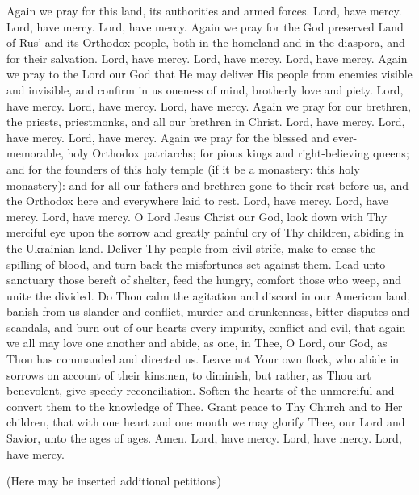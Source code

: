 \begin{liturgicaltext}
    \deacon Again we pray for this land, its authorities and armed forces.
    \choir Lord, have mercy. Lord, have mercy. Lord, have mercy.
    \deacon Again we pray for the God preserved Land of Rus' and its Orthodox people, both in the homeland and in the diaspora, and for their salvation.
    \choir Lord, have mercy. Lord, have mercy. Lord, have mercy.
    \deacon Again we pray to the Lord our God that He may deliver His people from enemies visible and invisible, and confirm in us oneness of mind, brotherly love and piety.
    \choir Lord, have mercy. Lord, have mercy. Lord, have mercy.
    \deacon Again we pray for our brethren, the priests, priestmonks, and all our brethren in Christ.
    \choir Lord, have mercy. Lord, have mercy. Lord, have mercy. \pagebreak
    \deacon Again we pray for the blessed and ever-memorable, holy Orthodox patriarchs; for pious kings and right-believing queens; and for the founders of this holy temple (if it be a monastery: this holy monastery): and for all our fathers and brethren gone to their rest before us, and the Orthodox here and everywhere laid to rest.
    \choir Lord, have mercy. Lord, have mercy. Lord, have mercy.
    \deacon O Lord Jesus Christ our God, look down with Thy merciful eye upon the sorrow and greatly painful cry of Thy children, abiding in the Ukrainian land. Deliver Thy people from civil strife, make to cease the spilling of blood, and turn back the misfortunes set against them. Lead unto sanctuary those bereft of shelter, feed the hungry, comfort those who weep, and unite the divided. Do Thou calm the agitation and discord in our American land, banish from us slander and conflict, murder and drunkenness, bitter disputes and scandals, and burn out of our hearts every impurity, conflict and evil, that again we all may love one another and abide, as one, in Thee, O Lord, our God, as Thou has commanded and directed us. Leave not Your own flock, who abide in sorrows on account of their kinsmen, to diminish, but rather, as Thou art benevolent, give speedy reconciliation. Soften the hearts of the unmerciful and convert them to the knowledge of Thee. Grant peace to Thy Church and to Her children, that with one heart and one mouth we may glorify Thee, our Lord and Savior, unto the ages of ages. Amen.
    \choir Lord, have mercy. Lord, have mercy. Lord, have mercy.
\end{liturgicaltext}
\begin{rubricmed}
    (Here may be inserted additional petitions)
\end{rubricmed}
